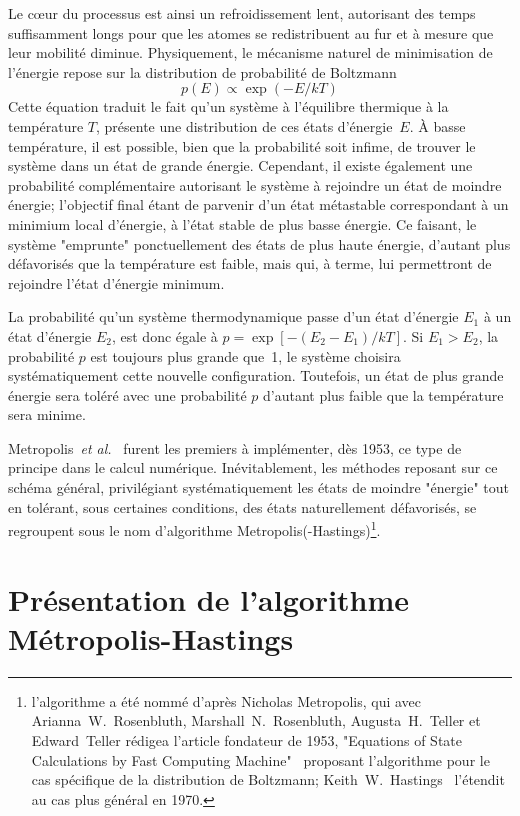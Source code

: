 \documentclass[10pt,a4paper,twoside]{report}
\begin{document}
Le c\oe ur du processus est ainsi un refroidissement lent, autorisant
des temps suffisamment longs pour que les atomes se redistribuent au
fur et à mesure que leur mobilité diminue. Physiquement, le mécanisme
naturel de minimisation de l'énergie repose sur la distribution de
probabilité de Boltzmann
\begin{equation}
  p(E)\propto\exp\left(-E/kT\right)
  \label{eq:Boltz}
\end{equation}
Cette équation traduit le fait qu'un système à l'équilibre thermique à
la température $T$, présente une distribution de ces états
d'énergie~$E$. \`A basse température, il est possible, bien que la
probabilité soit infime, de trouver le système dans un état de grande
énergie. Cependant, il existe également une probabilité complémentaire
autorisant le système à rejoindre un état de moindre énergie;
l'objectif final étant de parvenir d'un état métastable correspondant
à un minimium local d'énergie, à l'état stable de plus basse
énergie. Ce faisant, le système "emprunte" ponctuellement des états
de plus haute énergie, d'autant plus défavorisés que la température
est faible, mais qui, à terme, lui permettront de rejoindre l'état
d'énergie minimum.

La probabilité qu'un système thermodynamique passe d'un état d'énergie
$E_1$ à un état d'énergie $E_2$, est donc égale à
$p=\exp\left[-(E_2-E_1)/kT\right]$. Si $E_1>E_2$, la probabilité $p$
est toujours plus grande que~1, le système choisira systématiquement
cette nouvelle configuration. Toutefois, un état de plus grande
énergie sera toléré avec une probabilité $p$ d'autant plus faible que
la température sera minime.

Metropolis~\emph{et al.}~\cite{metro} furent les premiers à
implémenter, dès 1953, ce type de principe dans le calcul
numérique. Inévitablement, les méthodes reposant sur ce schéma
général, privilégiant systématiquement les états de moindre
"énergie" tout en tolérant, sous certaines conditions, des états
naturellement défavorisés, se regroupent sous le nom d'algorithme
Metropolis(-Hastings)\footnote{l'algorithme a été nommé d'après
  Nicholas Metropolis, qui avec Arianna~W.~Rosenbluth,
  Marshall~N.~Rosenbluth, Augusta~H.~Teller et Edward~Teller rédigea
  l'article fondateur de 1953, "Equations of State Calculations by Fast
  Computing Machine"~\cite{metro} proposant l'algorithme pour le
  cas spécifique de la distribution de Boltzmann;
  Keith~W.~Hastings~\cite{hastings} l'étendit au cas plus
  général en 1970.}.


\section{Présentation de l'algorithme Métropolis-Hastings}
\end{document}
